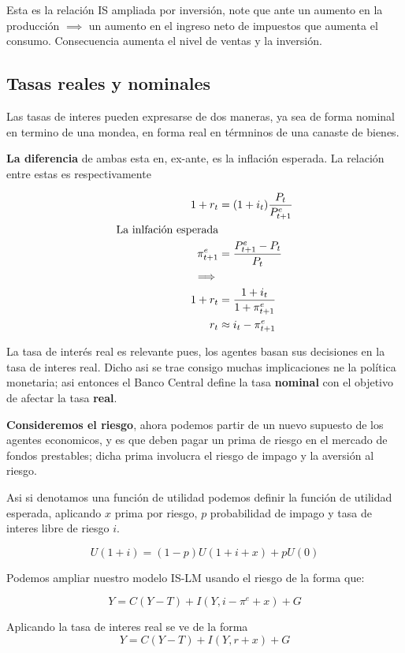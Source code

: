 Esta es la relación IS ampliada por inversión, note que ante un aumento en la producción $\implies$ un aumento en el ingreso neto de impuestos que aumenta el consumo. Consecuencia aumenta el nivel de ventas y la inversión.

\subsection{Tasas reales y nominales}

Las tasas de interes pueden expresarse de dos maneras, ya sea de forma nominal en termino de una mondea, en forma real en térmninos de una canaste de bienes. 

\textbf{La diferencia }de ambas esta en, ex-ante, es la inflación esperada. La relación entre estas es respectivamente

\begin{align}
    1 + r_{t} &= (1+i_{t})\frac{P_{t}}{P_{t+1}^{e}} \\
  \textup{La inlfación esperada}  &  \nonumber \\
    \pi_{t+1}^{e} &= \frac{P_{t+1}^{e}-P_{t}}{P_{t}} \\
    \implies &  \nonumber \\
    1 + r_{t} &= \frac{1+i_{t}}{1+\pi_{t+1}^{e}}\\
    r_{t} & \approx i_{t}-\pi_{t+1}^{e} 
\end{align}

La tasa de interés real es relevante pues, los agentes basan sus decisiones en la tasa de interes real. Dicho asi se trae consigo muchas implicaciones ne la política monetaria; asi entonces el Banco Central define la tasa \textbf{nominal} con el objetivo de afectar la tasa \textbf{real}. 

\textbf{Consideremos el riesgo}, ahora podemos partir de un nuevo supuesto de los agentes economicos, y es que deben pagar un prima de riesgo en el mercado de fondos prestables; dicha prima involucra el riesgo de impago y la aversión al riesgo.

Asi si denotamos una función de utilidad podemos definir la función de utilidad esperada, aplicando $x$ prima por riesgo, $p$ probabilidad de impago y tasa de interes libre de riesgo $i$.

\begin{equation}
    U(1+i)= (1-p)U(1+i+x)+ pU(0)
\end{equation}

Podemos ampliar nuestro modelo IS-LM usando el riesgo de la forma que:

\begin{equation}
    Y = C(Y-T)+I(Y, i-\pi^{e}+x)+G
\end{equation}

Aplicando la tasa de interes real se ve de la forma
\begin{equation}
    Y = C(Y-T)+I(Y, r+x)+G
\end{equation}